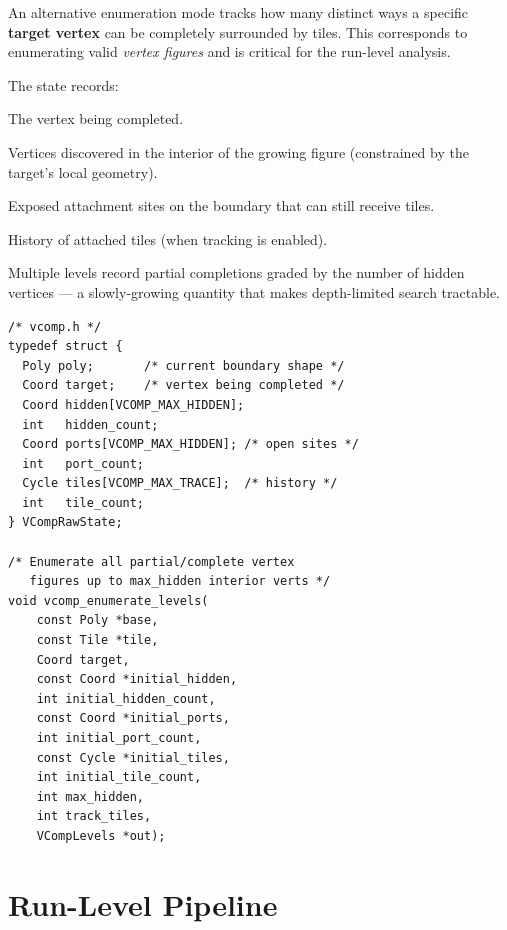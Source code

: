 \documentclass[10pt,a4paper]{article}
\let\polysection\section
\renewcommand\section{\needspace{0.16\textheight}\polysection}
\newcommand{\code}[1]{\texttt{\small #1}}
\newcommand{\file}[1]{\texttt{\footnotesize #1}}
\begin{document}
\begin{tcolorbox}[dualbox, title=Vertex-Completion Enumeration — \file{src/throughput/vcomp.h}]
  An alternative enumeration mode tracks how many distinct ways a
  specific \textbf{target vertex} can be completely surrounded by
  tiles.  This corresponds to enumerating valid \emph{vertex figures}
  and is critical for the run-level analysis.

  The state records:
  \begin{description}[leftmargin=0pt]
    \item[\code{target}] The vertex being completed.
    \item[\code{hidden}] Vertices discovered in the interior of the
      growing figure (constrained by the target's local geometry).
    \item[\code{ports}] Exposed attachment sites on the boundary that
      can still receive tiles.
    \item[\code{tiles}] History of attached tiles (when tracking is
      enabled).
  \end{description}

  Multiple levels record partial completions graded by the number of
  hidden vertices — a slowly-growing quantity that makes depth-limited
  search tractable.
\tcblower
\begin{verbatim}
/* vcomp.h */
typedef struct {
  Poly poly;       /* current boundary shape */
  Coord target;    /* vertex being completed */
  Coord hidden[VCOMP_MAX_HIDDEN];
  int   hidden_count;
  Coord ports[VCOMP_MAX_HIDDEN]; /* open sites */
  int   port_count;
  Cycle tiles[VCOMP_MAX_TRACE];  /* history */
  int   tile_count;
} VCompRawState;

/* Enumerate all partial/complete vertex
   figures up to max_hidden interior verts */
void vcomp_enumerate_levels(
    const Poly *base,
    const Tile *tile,
    Coord target,
    const Coord *initial_hidden,
    int initial_hidden_count,
    const Coord *initial_ports,
    int initial_port_count,
    const Cycle *initial_tiles,
    int initial_tile_count,
    int max_hidden,
    int track_tiles,
    VCompLevels *out);
\end{verbatim}
\end{tcolorbox}

\section{Run-Level Pipeline}
\end{document}
